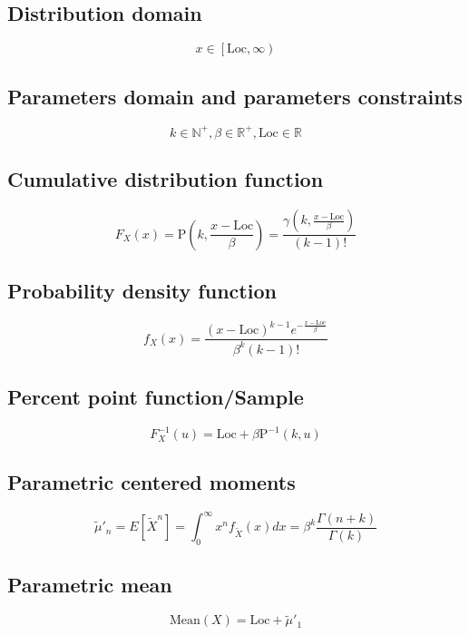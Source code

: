 \documentclass{article}
\begin{document}
\subsection{Distribution domain}
\begin{equation*} x\in\left[\text{Loc},\infty\right) \end{equation*}
\subsection{Parameters domain and parameters constraints}
\begin{equation*} k\in\mathbb{N}^{+}, \beta\in\mathbb{R}^{+}, \text{Loc}\in\mathbb{R} \end{equation*}
\subsection{Cumulative distribution function}
\begin{equation*} F_{X}\left(x\right)=\text{P}(k,\frac{x-\text{Loc}}{\beta})=\frac{\gamma(k,\frac{x-\text{Loc}}{\beta})}{(k-1)!} \end{equation*}
\subsection{Probability density function}
\begin{equation*} f_{X}\left(x\right)=\frac{(x-\text{Loc})^{k-1} e^{-\frac{x-\text{Loc}}{\beta}}}{\beta^k(k-1)!} \end{equation*}
\subsection{Percent point function/Sample}
\begin{equation*} F^{-1}_{X}\left(u\right)=\text{Loc}+\beta \text{P}^{-1}\left(k,u\right) \end{equation*}
\subsection{Parametric centered moments}
\begin{equation*} \tilde{\mu}'_{n}=E[\tilde{X}^n]=\int_{0}^{\infty}x^{n}f_{\tilde{X}}\left(x\right)dx=\beta^{k}\frac{\Gamma\left(n+k\right)}{\Gamma(k)} \end{equation*}
\subsection{Parametric mean}
\begin{equation*} \mathrm{Mean}(X)=\text{Loc}+\tilde{\mu}'_{1} \end{equation*}
\end{document}
